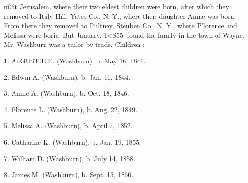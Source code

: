\documentclass{book}
\begin{document}
\^m\^.\^ 




at Jerusalem, where their two eldest children were born, after 
which they removed to Italy Hill, Yates Co., N. Y., where their 
daughter Annie was born. From there they removed to Pultney, 
Steuben Co., N. Y., where P'lorence and Melissa were boria. 
But January, 1<S55, found the family in the town of Wayne. 
Mr. Washburn was a tailor by trade. Children : 

1. AuGUSTiE E. (Washburn), b. May 16, 1841. 

2. Edwin A. (Washburn), b. Jan. 11, 1844. 

3. Annie A. (Washburn), b. Oct. 18, 1846. 

4. Florence L. (Washburn), b. Aug. 22, 1849. 

5. Melissa A. (Washburn), b. April 7, 1852. 

6. Catharine K. (Washburn), b. Jan. 19, 1855. 

7. William D. (Washburn), b. July 14, 1858. 

8. James M. (Washburn), b. Sept. 15, 1860. 
\end{document}
